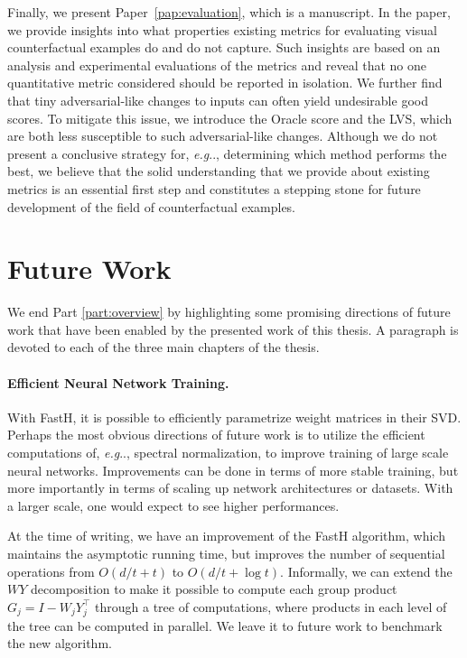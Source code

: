 \documentclass[11pt,a4paper,twoside,openright,final]{memoir}
\makeatletter
\DeclareRobustCommand\onedot{\futurelet\@let@token\@onedot}
\def\@onedot{\ifx\@let@token.\else.\null\fi\xspace}
\def\eg{\emph{e.g}\onedot} \def\Eg{\emph{E.g}\onedot}
\newcommand*{\paperref}[1]{Paper~\hyperref[#1]{\ref{#1}}}
\makeatother
\begin{document}
Finally, we present \paperref{pap:evaluation}, which is a manuscript.
In the paper, we provide insights into what properties existing metrics for evaluating visual counterfactual examples do and do not capture.
Such insights are based on an analysis and experimental evaluations of the metrics and reveal that no one quantitative metric considered should be reported in isolation.
We further find that tiny adversarial-like changes to inputs can often yield undesirable good scores. 
To mitigate this issue, we introduce the Oracle score and the LVS, which are both less susceptible to such adversarial-like changes. 
Although we do not present a conclusive strategy for, \eg, determining which method performs the best, we believe that the solid understanding that we provide about existing metrics is an essential first step and constitutes a stepping stone for future development of the field of counterfactual examples.

\section{Future Work}\label{sec:conclusion-future-work}
We end Part \ref{part:overview} by highlighting some promising directions of future work that have been enabled by the presented work of this thesis. 
A paragraph is devoted to each of the three main chapters of the thesis. 

\paragraph{Efficient Neural Network Training.}
With FastH, it is possible to efficiently parametrize weight matrices in their SVD.
Perhaps the most obvious directions of future work is to utilize the efficient computations of, \eg, spectral normalization, to improve training of large scale neural networks. 
Improvements can be done in terms of more stable training, but more importantly in terms of scaling up network architectures or datasets.
With a larger scale, one would expect to see higher performances. 

At the time of writing, we have an improvement of the FastH algorithm, which maintains the asymptotic running time, but improves the number of sequential operations from $O(d/t + t)$ to $O(d/t + \log t)$.
Informally, we can extend the $WY$ decomposition to make it possible to compute each group product $G_j=I-W_jY_j^\intercal$ through a tree of computations, where products in each level of the tree can be computed in parallel.  
We leave it to future work to benchmark the new algorithm.
\end{document}
